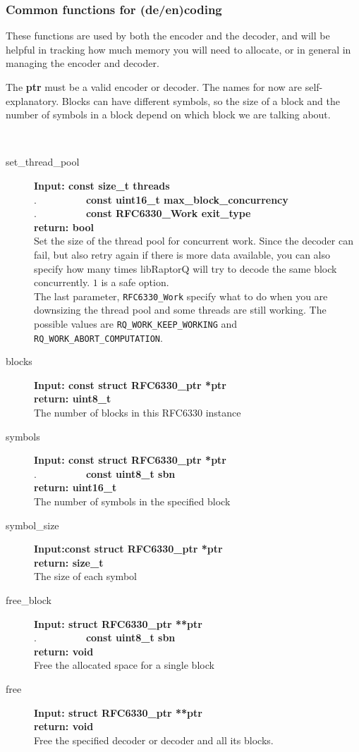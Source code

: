 \documentclass[11pt,a4paper]{refart}
\begin{document}
\newpage
\subsubsection{Common functions for (de/en)coding}

These functions are used by both the encoder and the decoder, and will be helpful in tracking how much memory
you will need to allocate, or in general in managing the encoder and decoder.

The \textbf{ptr} must be a valid encoder or decoder.
The names for now are self-explanatory. Blocks can have different symbols, so the size of a block and the number of symbols in a block
depend on which block we are talking about.

\\
\begin{description}
\item[set\_thread\_pool] \textbf{Input: const size\_t threads}\\
.\ \ \ \ \ \ \ \ \ \ \textbf{const uint16\_t max\_block\_concurrency}\\
.\ \ \ \ \ \ \ \ \ \ \textbf{const RFC6330\_Work exit\_type}\\
\textbf{return: bool}\\
Set the size of the thread pool for concurrent work. Since the decoder can fail, but also retry again if there is more data available,
you can also specify how many times libRaptorQ will try to decode the same block concurrently. $1$ is a safe option.\\
The last parameter, \texttt{RFC6330\_Work} specify what to do when you are downsizing the thread pool and some threads are still working. The possible values are \texttt{RQ\_WORK\_KEEP\_WORKING} and \texttt{RQ\_WORK\_ABORT\_COMPUTATION}.
\item[blocks] \textbf{Input: const struct RFC6330\_ptr *ptr}\\
\textbf{return: uint8\_t}\\
The number of blocks in this RFC6330 instance
\item[symbols]\textbf{Input: const struct RFC6330\_ptr *ptr}\\
.\ \ \ \ \ \ \ \ \ \ \textbf{const uint8\_t sbn}\\
\textbf{return: uint16\_t}\\
The number of symbols in the specified block
\item[symbol\_size]\textbf{Input:const struct RFC6330\_ptr *ptr}\\
\textbf{return: size\_t}\\
The size of each symbol
\item[free\_block]\textbf{Input: struct RFC6330\_ptr **ptr}\\
.\ \ \ \ \ \ \ \ \ \ \textbf{const uint8\_t sbn}\\
\textbf{return: void}\\
Free the allocated space for a single block
\item[free]\textbf{Input: struct RFC6330\_ptr **ptr}\\
\textbf{return: void}\\
Free the specified decoder or decoder and all its blocks.
\end{description}
\end{document}
